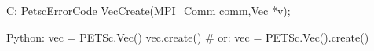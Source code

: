 C:
PetscErrorCode VecCreate(MPI_Comm comm,Vec *v);

Python:
vec = PETSc.Vec()
vec.create()
# or:
vec = PETSc.Vec().create()

